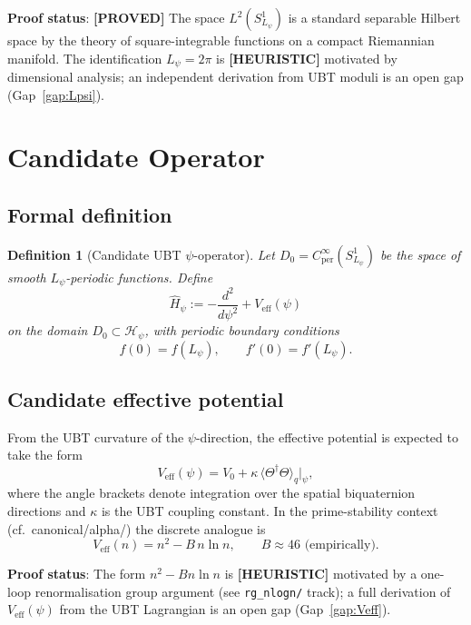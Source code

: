 \documentclass[11pt,a4paper]{article}
\newtheorem{definition}{Definition}
\newcommand{\proved}[1]{\textbf{[PROVED]} #1}
\newcommand{\heuristic}[1]{\textbf{[HEURISTIC]} #1}
\begin{document}
\textbf{Proof status}: \proved{The space $L^2(S^1_{L_\psi})$ is a standard
separable Hilbert space by the theory of square-integrable functions on a
compact Riemannian manifold.}  The identification $L_\psi = 2\pi$ is
\heuristic{motivated by dimensional analysis; an independent derivation from
UBT moduli is an open gap (Gap~\ref{gap:Lpsi}).}

\section{Candidate Operator}

\subsection{Formal definition}

\begin{definition}[Candidate UBT $\psi$-operator]
  \label{def:operator}
  Let $D_0 = C^\infty_\mathrm{per}(S^1_{L_\psi})$ be the space of smooth
  $L_\psi$-periodic functions.  Define
  \[
    \hat{H}_\psi := -\frac{d^2}{d\psi^2} + V_\mathrm{eff}(\psi)
  \]
  on the domain $D_0 \subset \mathscr{H}_\psi$, with periodic boundary
  conditions
  \[
    f(0) = f(L_\psi), \qquad f'(0) = f'(L_\psi).
  \]
\end{definition}

\subsection{Candidate effective potential}
\label{sec:Veff}

From the UBT curvature of the $\psi$-direction, the effective potential is
expected to take the form
\[
  V_\mathrm{eff}(\psi) = V_0 + \kappa\,\langle\Theta^\dagger\Theta\rangle_q
  \big|_\psi,
\]
where the angle brackets denote integration over the spatial biquaternion
directions and $\kappa$ is the UBT coupling constant.  In the prime-stability
context (cf.\ canonical/alpha/) the discrete analogue is
\[
  V_\mathrm{eff}(n) = n^2 - B\, n\ln n, \qquad
  B \approx 46 \text{ (empirically)}.
\]

\textbf{Proof status}: The form $n^2 - Bn\ln n$ is
\heuristic{motivated by a one-loop renormalisation group argument (see
\texttt{rg\_nlogn/} track); a full derivation of $V_\mathrm{eff}(\psi)$
from the UBT Lagrangian is an open gap (Gap~\ref{gap:Veff}).}
\end{document}
